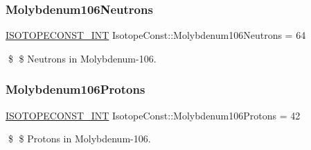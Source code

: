\subsubsection{\texorpdfstring{Molybdenum106\+Neutrons}{Molybdenum106Neutrons}}
{\footnotesize\ttfamily \mbox{\hyperlink{group___isotope_const-_macros_ga5f18360b3e99483a35c32d789e62621c}{I\+S\+O\+T\+O\+P\+E\+C\+O\+N\+S\+T\+\_\+\+I\+NT}} Isotope\+Const\+::\+Molybdenum106\+Neutrons = 64}

\$ \$ Neutrons in Molybdenum-\/106. \mbox{\label{group___isotope_const-_molybdenum-_mo106_ga1fc7477dfcd64217656e9efe30e9bcca}} 
\subsubsection{\texorpdfstring{Molybdenum106\+Protons}{Molybdenum106Protons}}
{\footnotesize\ttfamily \mbox{\hyperlink{group___isotope_const-_macros_ga5f18360b3e99483a35c32d789e62621c}{I\+S\+O\+T\+O\+P\+E\+C\+O\+N\+S\+T\+\_\+\+I\+NT}} Isotope\+Const\+::\+Molybdenum106\+Protons = 42}

\$ \$ Protons in Molybdenum-\/106. 